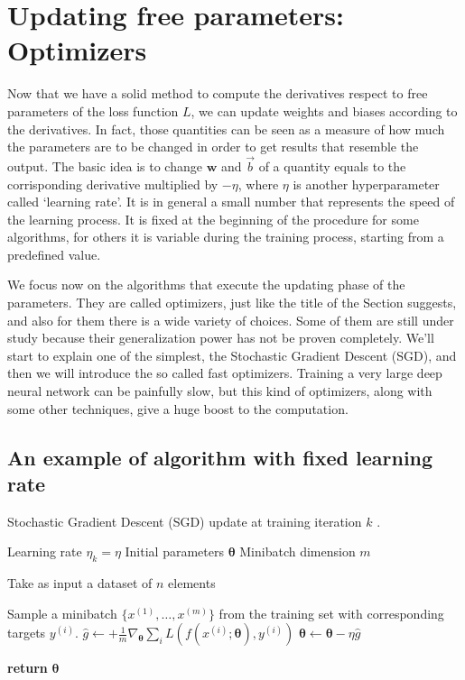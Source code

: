 \section{Updating free parameters: Optimizers}
\label{sec:OPTIMIZERS}
Now that we have a solid method to compute the derivatives respect to free parameters of the loss function $L$, we can update weights and biases according to the derivatives. In fact, those quantities can be seen as a measure of how much the parameters are to be changed in order to get results that resemble the output. The basic idea is to change $\mathbf{w}$ and $\vec{b}$ of a quantity equals to the corrisponding derivative multiplied by $-\eta$, where $\eta$ is another hyperparameter called `learning rate'. It is in general a small number that represents the speed of the learning process. It is fixed at the beginning of the procedure for some algorithms, for others it is variable during the training process, starting from a predefined value.

We focus now on the algorithms that execute the updating phase of the parameters. They are called optimizers, just like the title of the Section suggests, and also for them there is a wide variety of choices. Some of them are still under study because their generalization power has not be proven completely. We'll start to explain one of the simplest, the Stochastic Gradient Descent (SGD), and then we will introduce the so called fast optimizers. Training a very large deep neural network can be painfully slow, but this kind of optimizers, along with some other techniques, give a huge boost to the computation.

\subsection{An example of algorithm with fixed learning rate}
\begin{algorithm}[H]
\caption{Stochastic Gradient Descent (SGD) update at training iteration $k$ \cite{deeplearningbook}.}\label{alg:SGD}
\begin{algorithmic}[1]
\Require Learning rate $\eta_{k} = \eta$
\Require Initial parameters $\bm{\theta}$
\Require Minibatch dimension $m$

 \Comment Take as input a dataset of $n$ elements

\State Sample a minibatch $\{x^{(1)},\dots,x^{(m)}\}$ from the training set with corresponding targets $y^{(i)}$.
\State $\hat{g} \gets + \frac{1}{m} \nabla_{\bm{\theta}} \sum_{i} L(f(x^{(i)};\bm{\theta}), y^{(i)})$ 
\State $\bm{\theta} \gets \bm{\theta} - \eta \hat{g}$
\EndWhile

\State \textbf{return} $\bm{\theta}$
\EndProcedure
\end{algorithmic}
\end{algorithm}




